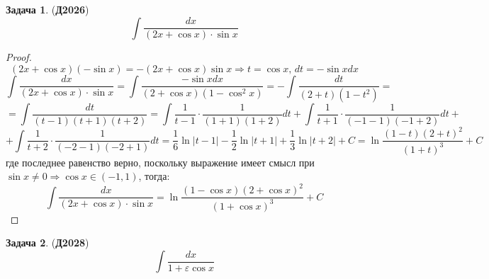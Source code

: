 \documentclass[12pt]{article}
\newcommand{\VE}{\varepsilon}
\theoremstyle{definition}
\newtheorem{problem}{Задача}
\DeclareMathOperator{\dint}{\displaystyle\int}
\begin{document}
\begin{problem}(\textbf{Д2026})
	$$
		\dint\dfrac{dx}{(2x  + \cos{x}){\cdot}\sin{x}}
	$$
\end{problem}
\begin{proof}
	$$
		(2x + \cos{x})(-\sin{x}) = - (2x + \cos{x})\sin{x} \Rightarrow t = \cos{x}, \, dt = -\sin{x}dx
	$$
	$$
		\dint\dfrac{dx}{(2x  + \cos{x}){\cdot}\sin{x}} = \dint \dfrac{-\sin{x}dx}{(2 + \cos{x})(1 - \cos^2{x})} = - \dint \dfrac{dt}{(2 + t)(1- t^2)} = 
	$$
	$$
		=	\dint\dfrac{dt}{(t - 1)(t + 1)(t + 2)} =  \dint \dfrac{1}{t - 1}{\cdot}\dfrac{1}{(1 + 1)(1 + 2)} dt + \dint \dfrac{1}{t + 1}{\cdot}\dfrac{1}{(-1-1)(-1+2)}dt + 
	$$
	$$
		+ \dint \dfrac{1}{t + 2}{\cdot}\dfrac{1}{(-2-1)(-2+1)}dt = \dfrac{1}{6}\ln{|t-1|} - \dfrac{1}{2}\ln{|t + 1|}  + \dfrac{1}{3}\ln{|t + 2|} + C= \ln{\dfrac{(1 -t)(2 + t)^2}{(1+t)^3}} +C
	$$
	где последнее равенство верно, поскольку выражение имеет смысл при $\sin{x} \neq 0 \Rightarrow \cos{x} \in (-1,1)$, тогда:
	$$
		\dint\dfrac{dx}{(2x  + \cos{x}){\cdot}\sin{x}} = \ln{\dfrac{(1 - \cos{x})(2 + \cos{x})^2}{(1+\cos{x})^3}} +C
	$$
\end{proof}
\begin{problem}(\textbf{Д2028})
	$$
		\dint\dfrac{dx}{1 + \VE \cos{x}}
	$$
\end{problem}
\end{document}

